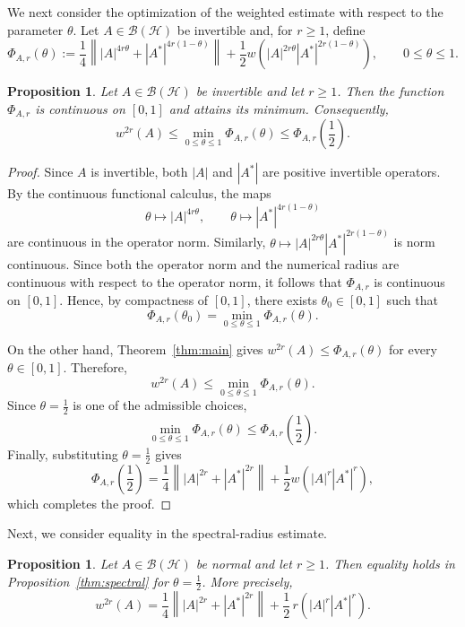 \documentclass[final,1p,times]{elsarticle}
\newtheorem{prop}[thm]{Proposition}
\newcommand{\BH}{\mathcal{B}(\mathcal{H})}
\newcommand{\norm}[1]{\left\lVert #1 \right\rVert}
\begin{document}
\medskip

We next consider the optimization of the weighted estimate with respect to
the parameter $\theta$. Let $A\in\BH$ be invertible and, for $r\geq1$, define
\[
\Phi_{A,r}(\theta)
:=
\frac14
\norm{
|A|^{4r\theta}
+
|A^*|^{4r(1-\theta)}
}
+
\frac12
w\!\left(
|A|^{2r\theta}
|A^*|^{2r(1-\theta)}
\right),
\qquad 0\leq\theta\leq1.
\]

\begin{prop}\label{prop:rigidity}
Let $A\in\BH$ be invertible and let $r\geq1$. Then the function
$\Phi_{A,r}$ is continuous on $[0,1]$ and attains its minimum.
Consequently,
\[
w^{2r}(A)
\leq
\min_{0\leq\theta\leq1}\Phi_{A,r}(\theta)
\leq
\Phi_{A,r}\!\left(\frac12\right).
\]
\end{prop}

\begin{proof}
Since $A$ is invertible, both $|A|$ and $|A^*|$ are positive
invertible operators. By the continuous functional calculus, the maps
\[
\theta\longmapsto |A|^{4r\theta},
\qquad
\theta\longmapsto |A^*|^{4r(1-\theta)}
\]
are continuous in the operator norm. Similarly, $\theta\longmapsto
|A|^{2r\theta}|A^*|^{2r(1-\theta)}$
is norm continuous. Since both the operator norm and the numerical radius are continuous
with respect to the operator norm, it follows that
$\Phi_{A,r}$ is continuous on $[0,1]$. Hence, by compactness of
$[0,1]$, there exists $\theta_0\in[0,1]$ such that
\[
\Phi_{A,r}(\theta_0)
=
\min_{0\leq\theta\leq1}\Phi_{A,r}(\theta).
\]

On the other hand, Theorem~\ref{thm:main} gives $w^{2r}(A)\leq\Phi_{A,r}(\theta)$
for every $\theta\in[0,1]$. Therefore,
\[
w^{2r}(A)
\leq
\min_{0\leq\theta\leq1}\Phi_{A,r}(\theta).
\]
Since $\theta=\frac12$ is one of the admissible choices,
\[
\min_{0\leq\theta\leq1}\Phi_{A,r}(\theta)
\leq
\Phi_{A,r}\!\left(\frac12\right).
\]
Finally, substituting $\theta=\frac12$ gives
\[
\Phi_{A,r}\!\left(\frac12\right)
=
\frac14\norm{|A|^{2r}+|A^*|^{2r}}
+
\frac12w\!\left(|A|^r|A^*|^r\right),
\]
which completes the proof.
\end{proof}

\medskip


Next, we consider equality in the spectral-radius estimate.

\begin{prop}\label{thm:equality-spectral}
Let $A\in\BH$ be normal and let $r\geq1$. Then equality holds in
Proposition~\ref{thm:spectral} for $\theta=\frac12$. More precisely,
\[
w^{2r}(A)
=
\frac14\norm{|A|^{2r}+|A^*|^{2r}}
+
\frac12\,r\!\left(|A|^r|A^*|^r\right).
\]
\end{prop}
\end{document}
